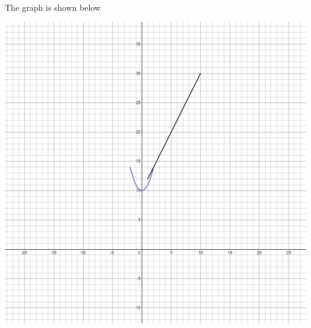 \documentclass{article}
\begin{document}
The graph is shown below

\includegraphics[scale = 0.1]{WOne_WA-Q2}
\end{document}
